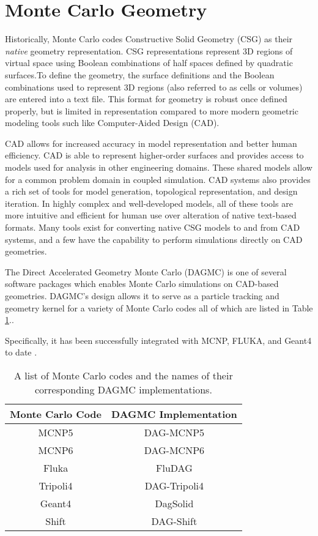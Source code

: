 \section{Monte Carlo Geometry}


Historically, Monte Carlo codes Constructive Solid Geometry (CSG) as their
\textit{native} geometry representation. CSG representations represent 3D
regions of virtual space using Boolean combinations of half spaces defined by
quadratic surfaces.To define the geometry, the surface definitions and the
Boolean combinations used to represent 3D regions (also referred to as cells or
volumes) are entered into a text file. This format for geometry is robust once
defined properly, but is limited in representation compared to more modern
geometric modeling tools such like Computer-Aided Design (CAD).

CAD allows for increased accuracy in model representation and better human
efficiency. CAD is able to represent higher-order surfaces and provides access
to models used for analysis in other engineering domains. These shared models
allow for a common problem domain in coupled simulation. CAD systems also provides a
rich set of tools for model generation, topological representation, and design
iteration. In highly complex and well-developed models, all of these tools are
more intuitive and efficient for human use over alteration of native text-based
formats. Many tools exist for converting native CSG models to and from CAD
systems, and a few have the capability to perform simulations directly on CAD
geometries.

The Direct Accelerated Geometry Monte Carlo (DAGMC) \cite{Tautges_2009} is one
of several software packages which enables Monte Carlo simulations on CAD-based
geometries. DAGMC's design allows it to serve as a particle
tracking and geometry kernel for a variety of Monte Carlo codes all of which are
listed in Table \ref{tab:dagmc_implementations}..


Specifically,
it has been successfully integrated with MCNP, FLUKA, and Geant4 to
date \cite{LANL_MCNP5_VOLIII, Bohlen_2014, GEANT4_2003}.

\begin{table}[H]
  \centering
  \begin{tabular}{c c}
    \hline
    Monte Carlo Code & DAGMC Implementation \\
    \hline
    MCNP5            & DAG-MCNP5            \\
    MCNP6            & DAG-MCNP6            \\
    Fluka            & FluDAG               \\
    Tripoli4         & DAG-Tripoli4         \\
    Geant4           & DagSolid             \\
    Shift            & DAG-Shift            \\
    \hline
  \end{tabular}
  \caption{A list of Monte Carlo codes and the names of their corresponding DAGMC implementations.}
  \label{tab:dagmc_implementations}
\end{table}

